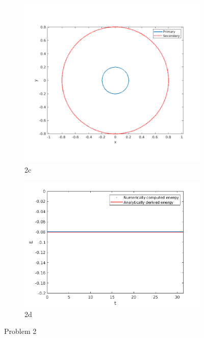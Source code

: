\documentclass[a4paper]{article}
\begin{document}
		\begin{figure} [h]
			\begin{subfigure} {.475\columnwidth}
				\includegraphics[width=\columnwidth]{../plots/2c_orbits.png}
				\caption{2c}
				\label{fig:2c}
			\end{subfigure}
			\hfill
			\begin{subfigure} {.475\columnwidth}
				\includegraphics[width=\columnwidth]{../plots/2d_energies.png}
				\caption{2d}
				\label{fig:2d}
			\end{subfigure}
			\caption{Problem 2}
			\label{fig:2}
		\end{figure}
	
\end{document}
